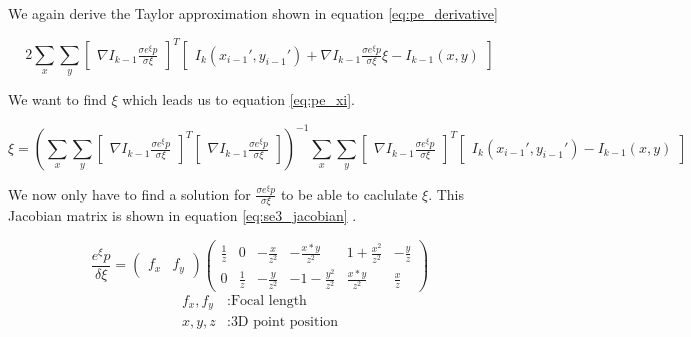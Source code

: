 \documentclass[11pt,a4paper,titlepage,oneside]{report}
\begin{document}
We again derive the Taylor approximation shown in equation \ref{eq:pe_derivative}

\begin{equation}\label{eq:pe_derivative}
	2\sum_x\sum_y\begin{bmatrix}\nabla I_{k-1}\frac{\sigma e^{\xi}p}{\sigma \xi}\end{bmatrix}^T\begin{bmatrix}I_{k}(x_{i-1}',y_{i-1}')+\nabla I_{k-1}\frac{\sigma e^{\xi} p}{\sigma \xi}\xi-I_{k-1}(x,y)\end{bmatrix}
\end{equation}

We want to find $\xi$ which leads us to equation \ref{eq:pe_xi}.

\tiny
\begin{equation}\label{eq:pe_xi}
	\xi=(\sum_x\sum_y\begin{bmatrix}\nabla I_{k-1}\frac{\sigma e^{\xi}p}{\sigma \xi}\end{bmatrix}^T\begin{bmatrix}\nabla I_{k-1}\frac{\sigma e^{\xi}p}{\sigma \xi}\end{bmatrix})^{-1}
	\sum_x\sum_y\begin{bmatrix}\nabla I_{k-1}\frac{\sigma e^{\xi}p}{\sigma \xi}\end{bmatrix}^T\begin{bmatrix}I_{k}(x_{i-1}',y_{i-1}') - I_{k-1}(x,y)\end{bmatrix}
\end{equation}
\normalsize

We now only have to find a solution for $\frac{\sigma e^{\xi}p}{\sigma \xi}$ to be able to caclulate $\xi$. This Jacobian matrix is shown in equation \ref{eq:se3_jacobian} \cite{se3_explain}.

\begin{equation}\label{eq:se3_jacobian}
	\frac{e^{\xi}p}{\delta \xi}=
	\begin{pmatrix}
		f_x & f_y
	\end{pmatrix}
	\begin{pmatrix}
		\frac{1}{z} & 0 & -\frac{x}{z^2} & -\frac{x*y}{z^2} & 1 + \frac{x^2}{z^2} & -\frac{y}{z} \\
		0 & \frac{1}{z}  & -\frac{y}{z^2} & -1 - \frac{y^2}{z^2} & \frac{x*y}{z^2} &  \frac{x}{z}
	\end{pmatrix}
\end{equation}
\begin{align*}
	f_x,f_y	&:	\text{Focal length}\\
	x,y,z		&:	\text{3D point position}\\
\end{align*}
\end{document}
